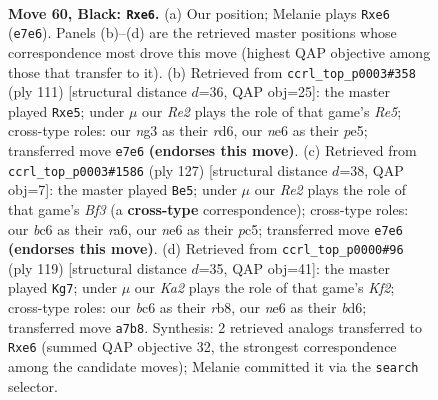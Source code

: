 \documentclass[11pt]{article}
\begin{document}
\clearpage

\begin{figure}[p]\centering
\begin{subfigure}{0.46\textwidth}\centering
\resizebox{\linewidth}{!}{%
\newchessgame
\chessboard[
  setfen={8/k3r3/2B1N3/2R2p2/1P6/6N1/1K4P1/1b6 b - - 17 60},
  showmover=false,
  pgfstyle=straightmove, color=movearrow, markmove={e7-e6}
]}
\caption{}
\end{subfigure}\hfill
\begin{subfigure}{0.46\textwidth}\centering
\resizebox{\linewidth}{!}{%
\newchessgame
\chessboard[
  setfen={2k5/8/3R3p/2B1P3/4r1bK/P7/8/8 b - - 0 56},
  showmover=false,
  pgfstyle=straightmove, color=movearrow, markmove={e4-e5}
]}
\caption{}
\end{subfigure}
\\[4pt]
\begin{subfigure}{0.46\textwidth}\centering
\resizebox{\linewidth}{!}{%
\newchessgame
\chessboard[
  setfen={7k/8/R4b2/2P2N1P/8/2r2p2/5K2/8 b - - 2 64},
  showmover=false,
  pgfstyle=straightmove, color=movearrow, markmove={f6-e5}
]}
\caption{}
\end{subfigure}\hfill
\begin{subfigure}{0.46\textwidth}\centering
\resizebox{\linewidth}{!}{%
\newchessgame
\chessboard[
  setfen={1R6/5k2/2rB4/8/2bKP3/1p6/1P6/8 b - - 29 60},
  showmover=false,
  pgfstyle=straightmove, color=movearrow, markmove={f7-g7}
]}
\caption{}
\end{subfigure}
\caption{\textbf{Move 60, Black: \texttt{Rxe6}.} (a) Our position; Melanie plays \texttt{Rxe6} (\texttt{e7e6}). Panels (b)--(d) are the retrieved master positions whose correspondence most drove this move (highest QAP objective among those that transfer to it). (b) Retrieved from \texttt{ccrl\_top\_p0003\#358} (ply 111) [structural distance $d$=36, QAP obj=25]: the master played \texttt{Rxe5}; under $\mu$ our \emph{Re2} plays the role of that game's \emph{Re5}; cross-type roles: our \emph{n}g3 as their \emph{r}d6, our \emph{n}e6 as their \emph{p}e5; transferred move \texttt{e7e6} \textbf{(endorses this move)}. (c) Retrieved from \texttt{ccrl\_top\_p0003\#1586} (ply 127) [structural distance $d$=38, QAP obj=7]: the master played \texttt{Be5}; under $\mu$ our \emph{Re2} plays the role of that game's \emph{Bf3} (a \textbf{cross-type} correspondence); cross-type roles: our \emph{b}c6 as their \emph{r}a6, our \emph{n}e6 as their \emph{p}c5; transferred move \texttt{e7e6} \textbf{(endorses this move)}. (d) Retrieved from \texttt{ccrl\_top\_p0000\#96} (ply 119) [structural distance $d$=35, QAP obj=41]: the master played \texttt{Kg7}; under $\mu$ our \emph{Ka2} plays the role of that game's \emph{Kf2}; cross-type roles: our \emph{b}c6 as their \emph{r}b8, our \emph{n}e6 as their \emph{b}d6; transferred move \texttt{a7b8}. Synthesis: 2 retrieved analogs transferred to \texttt{Rxe6} (summed QAP objective 32, the strongest correspondence among the candidate moves); Melanie committed it via the \texttt{search} selector.}
\label{fig:thought-m119}
\end{figure}
\end{document}

